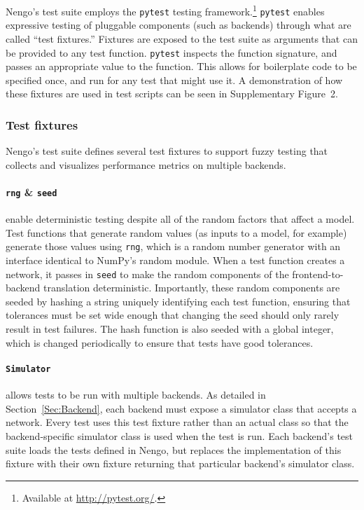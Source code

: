 \documentclass{frontiersSCNS}
\begin{document}
Nengo's test suite employs the \texttt{pytest}
testing framework.\footnote{Available at \url{http://pytest.org/}.}
\texttt{pytest} enables
expressive testing of pluggable components
(such as backends)
through what are called ``test fixtures.''
Fixtures are exposed to the test suite
as arguments that can be provided
to any test function.
\texttt{pytest} inspects the function signature,
and passes an appropriate value
to the function.
This allows for boilerplate code
to be specified once,
and run for any test that might use it.
A demonstration of how these fixtures
are used in test scripts
can be seen in Supplementary Figure~2.

\subsubsection{Test fixtures}

Nengo's test suite defines several test fixtures
to support fuzzy testing
that collects and visualizes performance metrics
on multiple backends.

\paragraph{\texttt{rng} \& \texttt{seed}}
enable deterministic testing despite
all of the random factors that affect a model.
Test functions that generate random values
(as inputs to a model, for example)
generate those values using \texttt{rng},
which is a random number generator
with an interface identical to
NumPy's random module.
When a test function creates a network,
it passes in \texttt{seed} to make
the random components
of the frontend-to-backend translation deterministic.
Importantly, these random components
are seeded by hashing a string uniquely
identifying each test function,
ensuring that tolerances must be set
wide enough that changing the seed
should only rarely result in test failures.
The hash function is also seeded
with a global integer,
which is changed periodically to ensure
that tests have good tolerances.

\paragraph{\texttt{Simulator}}
allows tests to be run with multiple backends.
As detailed in Section~\ref{Sec:Backend},
each backend must expose a simulator class
that accepts a network.
Every test uses this test fixture rather than
an actual class so that
the backend-specific simulator class is used
when the test is run.
Each backend's test suite loads
the tests defined in Nengo,
but replaces the implementation of
this fixture with their own fixture
returning that particular backend's simulator class.
\end{document}
